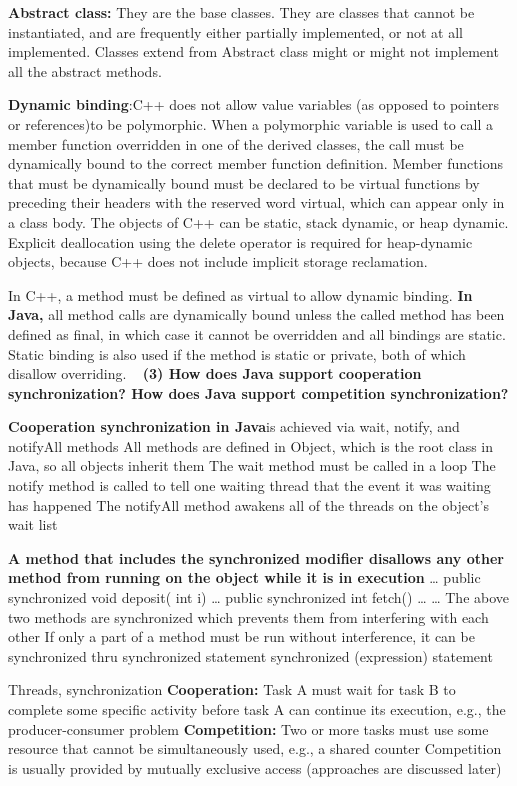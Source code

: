 \documentclass{article}
\begin{document}
\textbf{Abstract class:} They are the base classes. They are classes that cannot be instantiated, and are frequently either partially implemented, or not at all implemented. Classes extend from Abstract class might or might not implement all the abstract methods.

\textbf{Dynamic binding}:C++ does not allow value variables (as opposed to pointers or references)to be polymorphic. When a polymorphic variable is used to call a member
function overridden in one of the derived classes, the call must be dynamically
bound to the correct member function definition. Member functions that must
be dynamically bound must be declared to be virtual functions by preceding
their headers with the reserved word virtual, which can appear only in a
class body.
The objects of C++ can be static, stack dynamic, or heap dynamic. Explicit
deallocation using the delete operator is required for heap-dynamic objects,
because C++ does not include implicit storage reclamation.

In C++, a method must be defined as virtual to allow dynamic binding. \textbf{In Java,}
all method calls are dynamically bound unless the called method has been
defined as final, in which case it cannot be overridden and all bindings are
static. Static binding is also used if the method is static or private, both of
which disallow overriding.
 
\textbf{(3) How does Java support cooperation synchronization? How does Java support competition synchronization?}

\textbf{Cooperation synchronization in Java}is achieved via wait, notify, and notifyAll methods
All methods are defined in Object, which is the root class in Java, so all objects inherit them
The wait method must be called in a loop
The notify method is called to tell one waiting thread that the event it was waiting has happened
The notifyAll method awakens all of the threads on the object’s wait list



\textbf{A method that includes the synchronized modifier disallows any other method from running on the object while it is in execution}
…
public synchronized void deposit( int i) {…}
public synchronized int fetch() {…}
…
The above two methods are synchronized which prevents them from interfering with each other
If only a part of a method must be run without interference, it can be synchronized thru synchronized statement
synchronized (expression) 
  statement



Threads, synchronization
\textbf{Cooperation:} Task A must wait for task B to complete some specific activity before task A can continue its execution, e.g., the producer-consumer problem
\textbf{Competition: }Two or more tasks must use some resource that cannot be simultaneously used, e.g., a shared counter
Competition is usually provided by mutually exclusive access  (approaches are discussed later)           
\end{document}
